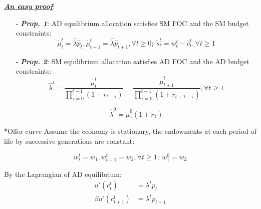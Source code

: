 \documentclass[10pt,landscape,a4paper]{article}
\makeatletter
\renewcommand{\subsection}{\@startsection{subsection}{1}{0mm}{.2ex}{.2ex}{\small\bfseries}}
\makeatother
\begin{document}
\begin{multicols*}{3}

\vspace{2pt}
\underline{\textit{\textbf{An easy proof}}}:
\begin{itemize}
    \item[-] \textbf{\textit{Prop. 1}}: AD equilibrium allocation  satisfies SM FOC and the SM budget constraints: 
    $$\tilde{\mu}_t^t=\hat{\lambda}\hat{p}_t,\tilde{\mu}_{t+1}^t=\hat{\lambda}\hat{p}_{t+1},\forall t\geq 0;\  \tilde{s}^t_t=w^t_t-\hat{c}^t_t,\forall t\geq 1$$
    \item[-] \textbf{\textit{Prop. 2}}: SM equilibrium allocation satisfies AD FOC and the AD budget constraints:  $$\hat{\lambda}^t=\frac{\tilde{\mu}^t_t}{\prod^{t-1}_{\tau=0}(1+\tilde{r}_{t-\tau})}=\frac{\tilde{\mu}^t_{t+1}}{\prod^{t-1}_{\tau=0}(1+\tilde{r}_{t+1-\tau})},\forall t\geq 1$$
    
    $$\hat{\lambda}^0=\tilde{\mu}^0_1(1+\tilde{r}_1)$$
\end{itemize}

\subsection*{Offer curve}
\scriptsize
Assume the economy is stationary, the endowments at each period of life by successive generations are constant:

$$w^t_t=w_1,w^t_{t+1}=w_2,\forall t\geq 1;\ w^0_1=w_2$$

By the Lagrangian of AD equilibrium:
\begin{align*}
    u'(c^t_t) &=\lambda^t p_t\\
    \beta u'(c^t_{t+1}) &= \lambda^t p_{t+1}
\end{align*}


\end{multicols*}
\end{document}
